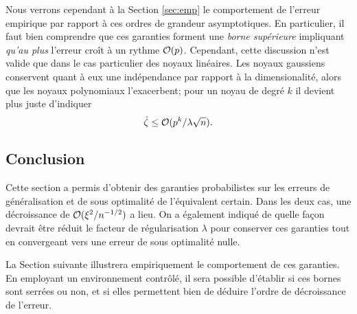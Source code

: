 Nous verrons cependant à la Section \ref{sec:emp} le comportement de l'erreur empirique
par rapport à ces ordres de grandeur asymptotiques. En particulier, il faut bien
comprendre que ces garanties forment une \textit{borne supérieure} impliquant \textit{qu'au plus}
l'erreur croît à un rythme $\mathcal O(p)$. 
Cependant, cette discussion n'est valide que dans le cas particulier des noyaux
linéaires. Les noyaux gaussiens conservent quant à eux une indépendance par rapport à la
dimensionalité, alors que les noyaux polynomiaux l'exacerbent; pour un noyau de degré $k$
il devient plus juste d'indiquer
\begin{equation}
  \hat\zeta \leq \mathcal O(p^k/\lambda\sqrt{n}).
\end{equation}

\subsection{Conclusion}

Cette section a permis d'obtenir des garanties probabilistes sur les erreurs de
généralisation et de sous optimalité de l'équivalent certain. Dans les deux cas, une
décroissance de $\mathcal O(\xi^2/n^{-1/2})$ a lieu. On a également indiqué de quelle façon
devrait être réduit le facteur de régularisation $\lambda$ pour conserver ces garanties tout en
convergeant vers une erreur de sous optimalité nulle.

La Section suivante illustrera empiriquement le comportement de ces garanties. En
employant un environnement contrôlé, il sera possible d'établir si ces bornes sont serrées
ou non, et si elles permettent bien de déduire l'ordre de décroissance de l'erreur. 






